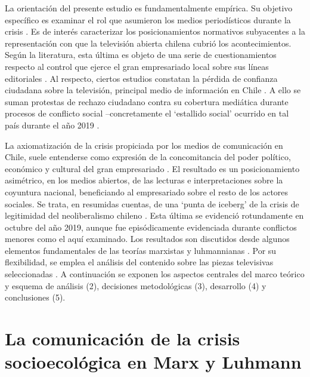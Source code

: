 \documentclass{textolivre}
\begin{document}
La orientación del presente estudio es fundamentalmente empírica. Su objetivo
específico es examinar el rol que asumieron los medios periodísticos durante la crisis
\cite{Mascareo2018b}. Es de interés caracterizar los posicionamientos normativos
subyacentes a la representación con que la televisión abierta chilena cubrió los
acontecimientos. Según la literatura, esta última es objeto de una serie de
cuestionamientos respecto al control que ejerce el gran empresariado local sobre sus
líneas editoriales \cite{cardenas2019,sapiezynska2013}. Al
respecto, ciertos estudios constatan la pérdida de confianza ciudadana sobre la televisión,
principal medio de información en Chile \cite{newman2019}. A ello se suman
protestas de rechazo ciudadano contra su cobertura mediática durante procesos de
conflicto social --concretamente el ‘estallido social’ ocurrido en tal país durante el año
2019 \cite{almeida}.

La axiomatización de la crisis propiciada por los medios de comunicación en Chile,
suele entenderse como expresión de la concomitancia del poder político, económico y
cultural del gran empresariado \cite[p. 371--395]{palet}. El resultado es un
posicionamiento asimétrico, en los medios abiertos, de las lecturas e interpretaciones
sobre la coyuntura nacional, beneficiando al empresariado sobre el resto de los actores
sociales. Se trata, en resumidas cuentas, de una ‘punta de iceberg’ de la crisis de
legitimidad del neoliberalismo chileno \cite{solimano}. Esta última se evidenció
rotundamente en octubre del año 2019, aunque fue episódicamente evidenciada durante
conflictos menores como el aquí examinado. Los resultados son discutidos desde algunos
elementos fundamentales de las teorías marxistas y luhmannianas \cite{Luhmann1984,marx2003,marx2010,Mascareo2018,wallerstein}.
Por su
flexibilidad, se emplea el análisis del contenido \cite{strauss2002} sobre las
piezas televisivas seleccionadas \cite{eiroa2017,MartnezSalgado2012}. 
A continuación se exponen los aspectos centrales del marco teórico y
esquema de análisis (2), decisiones metodológicas (3), desarrollo (4) y conclusiones (5).


\section{La comunicación de la crisis socioecológica en Marx y Luhmann}\label{sec-lacom}
\end{document}
